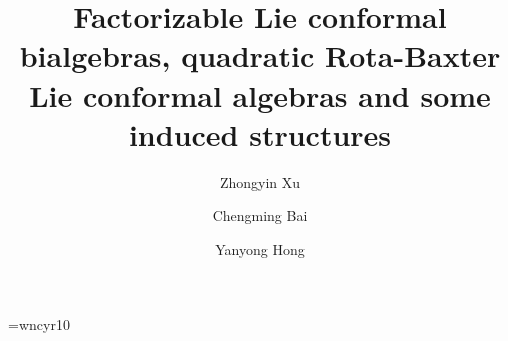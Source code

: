 \documentclass[12pt]{amsart}
\begin{document}
     
     
     
     
     
     
     \nc{\os}{\overline{\fraks}}
     
    \nc{\frakTx}{\frakT}      %
    \nc{\ox}{\overline{\frakx}} 
     

    \font\cyr=wncyr10




    \title[Factorizable Lie conformal algebras]{Factorizable Lie conformal bialgebras, quadratic Rota-Baxter Lie conformal algebras and some induced structures}

    \author{Zhongyin Xu}
    \address{Chern Institute of Mathematics \& LPMC, Nankai University,
        Tianjin, 300071, China}

    \author{Chengming Bai}
    \address{Chern Institute of Mathematics \& LPMC, Nankai University, Tianjin 300071, PR China}

    \author{Yanyong Hong}
    \address{School of Mathematics, Hangzhou Normal University,
        Hangzhou, 311121, China}
\end{document}
